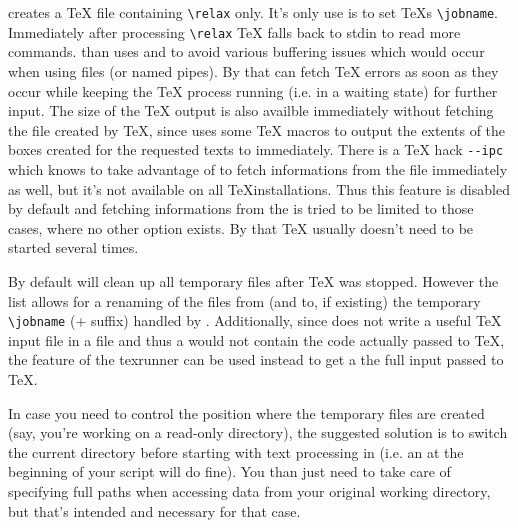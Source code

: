 \PyX{} creates a \TeX{} file containing \verb|\relax| only. It's only
use is to set \TeX{}s \verb|\jobname|. Immediately after processing
\verb|\relax| \TeX{} falls back to stdin to read more commands. \PyX{}
than uses  and  to avoid various buffering
issues which would occur when using files (or named pipes). By that
\PyX{} can fetch \TeX{} errors as soon as they occur while keeping the
\TeX{} process running (i.e. in a waiting state) for further input.
The size of the \TeX{} output is also availble immediately without
fetching the  file created by \TeX, since \PyX{} uses some
\TeX{} macros to output the extents of the boxes created for the
requested texts to  immediately. There is a TeX hack
\verb|--ipc| which \PyX{} knows to take advantage of to fetch
informations from the  file immediately as well, but it's
not available on all \TeX installations. Thus this feature is disabled
by default and fetching informations from the  is tried to
be limited to those cases, where no other option exists. By that
\TeX{} usually doesn't need to be started several times.

By default \PyX{} will clean up all temporary files after \TeX{} was
stopped. However the  list allows for a renaming of the
files from (and to, if existing) the temporary \verb|\jobname| (+
suffix) handled by \PyX{}. Additionally, since \PyX{} does not write a
useful \TeX{} input file in a file and thus a
 would not contain the code actually
passed to \TeX{}, the  feature of the texrunner can be
used instead to get a the full input passed to \TeX{}.

In case you need to control the position where the temporary files are
created (say, you're working on a read-only directory), the suggested
solution is to switch the current directory before starting with text
processing in \PyX{} (i.e. an  at the beginning of your
script will do fine). You than just need to take care of specifying
full paths when accessing data from your original working directory,
but that's intended and necessary for that case.

